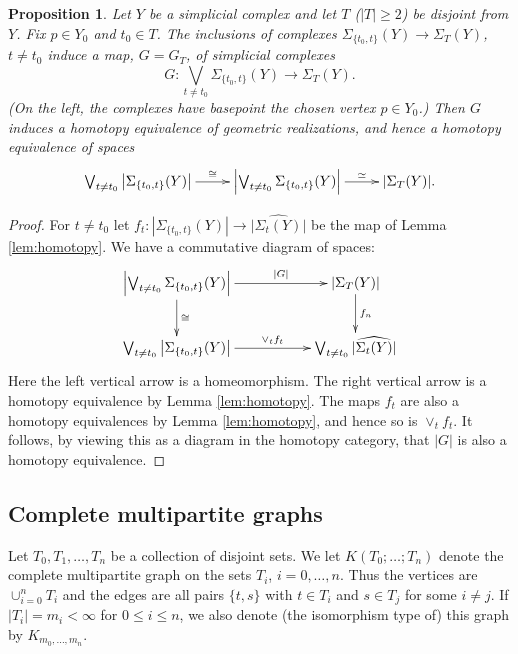 \documentclass[12pt]{amsart}
\newtheorem{prop}[lem]{Proposition}
\theoremstyle{definition}
\newcommand{\<}{\langle}
\renewcommand{\>}{\rangle}
\newcommand{\mc}[2]{\Sigma_{#1}(#2)}
\newcommand{\pmc}[2]{\widehat{|\mc{#1}{#2}|}}
\begin{document}
\begin{prop}\label{prop:homotopy} Let $Y$ be a simplicial complex and let $T$ ($|T|\geq 2$) be disjoint from $Y$. Fix $p\in Y_0$ and $t_0\in T$. The inclusions of complexes
$\mc{\{ t_0,t\}}{Y}\to \mc{T}{Y}$, $t\not= t_0$ induce a map, $G=G_T$, of simplicial complexes 
\[
G:\bigvee_{t\not=t_0}\mc{\{ t_0,t\} }{Y}\longrightarrow \mc{T}{Y}.
\]
(On the left, the complexes have basepoint the chosen vertex $p\in Y_0$.) Then $G$ induces a homotopy equivalence of geometric realizations, and hence a homotopy equivalence of spaces
\[
\xymatrix{
\bigvee_{t\not=t_0}\left| \mc{\{ t_0,t\}}{Y}\right|\ar^-{\cong}[r]&\left| \bigvee_{t\not=t_0}\mc{\{ t_0,t\} }{Y}\right| \ar^-{\simeq}[r]&|\mc{T}{Y}|.\\
}
\]
\end{prop}
\begin{proof}  For $t\not=t_0$ let $f_t:|\mc{\{ t_0,t\}}{Y}|\to \pmc{t}{Y}$ be the map of Lemma \ref{lem:homotopy}.
We have a commutative diagram of spaces:
\[
\xymatrix{
\left|\bigvee_{t\not=t_0}\mc{\{ t_0,t\}}{Y} \right|\ar^-{|G|}[rr]\ar^-{\cong}[d]& &\left| \mc{T}{Y}\right|\ar^-{f_n}[d]\\
\bigvee_{t\not=t_0}\left| \mc{\{ t_0,t\}}{Y}\right|\ar^-{\vee_t f_t}[rr]&&\bigvee_{t\not=t_0}\pmc{t}{Y}\\
}
\]
Here the left vertical arrow is a homeomorphism. The right vertical arrow is a homotopy equivalence by Lemma \ref{lem:homotopy}. The maps $f_t$ are also a homotopy equivalences by 
Lemma \ref{lem:homotopy}, and hence so is $\vee_t f_t$. It follows, by viewing this as a diagram in the homotopy category, that $|G|$ is also a homotopy equivalence.
\end{proof}

\subsection{Complete multipartite graphs}

Let $T_0,T_1,\ldots, T_n$ be a collection of disjoint  sets. We let $K(T_0;\ldots;T_n)$ denote the complete multipartite graph on the sets $T_i$, $i=0,\ldots,n$. Thus the vertices are 
$\cup_{i=0}^n T_i$ and the edges are all pairs $\{ t,s\}$ with $t\in T_i$ and $s\in T_j$ for some $i\not=j$. If $|T_i|=m_i<\infty$ for $0\leq i\leq n$, we also denote (the isomorphism type of) this graph by $K_{m_0,\ldots,m_n}$.
\end{document}
